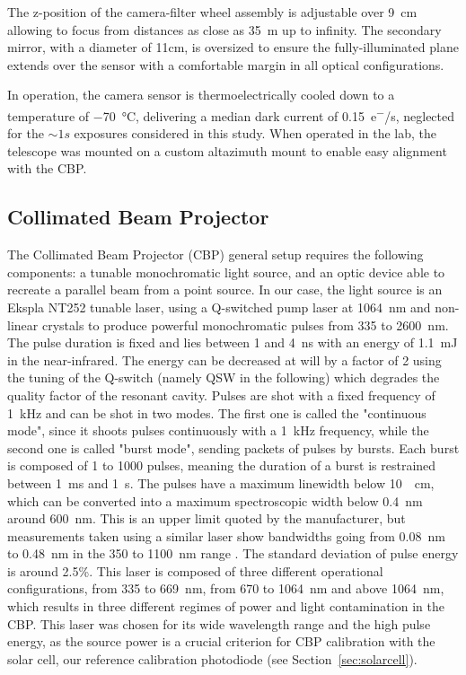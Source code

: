The z-position of the camera-filter wheel assembly is adjustable over \SI{9}{\centi\meter} allowing to focus from distances as close as \SI{35}{m} up to infinity. The secondary mirror, with a diameter of 11cm, is oversized to ensure the fully-illuminated plane extends over the sensor with a comfortable margin in all optical configurations.

In operation, the camera sensor is thermoelectrically cooled down to a temperature of \SI{-70}{\celsius}, delivering a median dark current of \SI{0.15}{e^-/s}, neglected for the $\sim 1s$ exposures considered in this study. When operated in the lab, the telescope was mounted on a custom altazimuth mount to enable easy alignment with the CBP.

\subsection{Collimated Beam Projector}
\label{sec:cbp}

The Collimated Beam Projector (CBP) general setup requires the following components: a tunable monochromatic light source, and an optic device able to recreate a parallel beam from a point source. In our case, the light source is an Ekspla NT252 tunable laser, using a Q-switched pump laser at \SI{1064}{\nano\meter} and non-linear crystals to produce powerful monochromatic pulses from 335 to \SI{2600}{\nano\meter}. The pulse duration is fixed and lies between 1 and \SI{4}{\nano\second} with an energy of \SI{1.1}{\milli\joule} in the near-infrared. The energy can be decreased at will by a factor of 2 using the tuning of the Q-switch (namely QSW in the following) which degrades the quality factor of the resonant cavity. Pulses are shot with a fixed frequency of \SI{1}{\kilo\hertz} and can be shot in two modes. The first one is called the "continuous mode", since it shoots pulses continuously with a \SI{1}{\kilo\hertz} frequency, while the second one is called "burst mode", sending packets of pulses by bursts. Each burst is composed of 1 to 1000 pulses, meaning the duration of a burst is restrained between \SI{1}{\milli\second} and \SI{1}{\second}. The pulses have a maximum linewidth below \SI{10}{\per\cm}, which can be converted into a maximum spectroscopic width below \SI{0.4}{\nano\meter} around \SI{600}{\nano\meter}. This is an upper limit quoted by the manufacturer, but measurements taken using a similar laser show bandwidths going from \SI{0.08}{\nm} to \SI{0.48}{\nm} in the 350 to \SI{1100}{\nm} range \citep{woodward2018}. The standard deviation of pulse energy is around 2.5\%. This laser is composed of three different operational configurations, from 335 to \SI{669}{\nano\meter}, from 670 to \SI{1064}{\nano\meter} and above \SI{1064}{\nano\meter}, which results in three different regimes of power and light contamination in the CBP. This laser was chosen for its wide wavelength range and the high pulse energy, as the source power is a crucial criterion for CBP calibration with the solar cell, our reference calibration photodiode (see Section~\ref{sec:solarcell}). 

